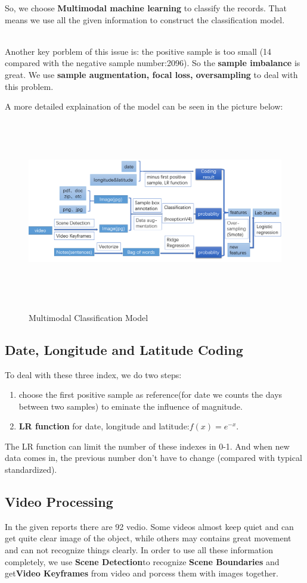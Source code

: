 \documentclass[12pt]{article}
\begin{document}
So, we choose \textbf{Multimodal machine learning} to classify the records.
That means we use all the given information to construct the classification model.

\quad \\
Another key porblem of this issue is: the positive sample is too small (14 compared with the negative sample number:2096). So the \textbf{sample imbalance} is great. We use \textbf{sample augmentation, focal loss, oversampling} to deal with this problem.

A more detailed explaination of the model can be seen in the picture below:
\begin{figure}[H]
	\centering
	\includegraphics[width=18cm,height=8cm]{./pictures/problem2.png}\label{overall}
	\caption{Multimodal Classification Model}
\end{figure}


\subsection{Date, Longitude and Latitude Coding}
To deal with these three index, we do two steps:
\begin{enumerate}
	\item choose the first positive sample as reference(for date we counts the days between two samples) to eminate the influence of magnitude.
	\item \textbf{ LR function} for date, longitude and latitude:$f(x)=e^{-x}$.
	
\end{enumerate} 

The LR function can limit the number of these indexes in 0-1. And when new data comes in, the previous number don't have to change (compared with typical standardized).
\subsection{Video Processing}
In the given reports there are 92 vedio. Some videos almost keep quiet and can get quite clear image of the object, while others may contains great movement and can not recognize things clearly. In order to use all these information completely, we use \textbf{Scene Detection}to recognize \textbf{Scene Boundaries} and get\textbf{Video Keyframes} from video and porcess them with images together.
\end{document}

